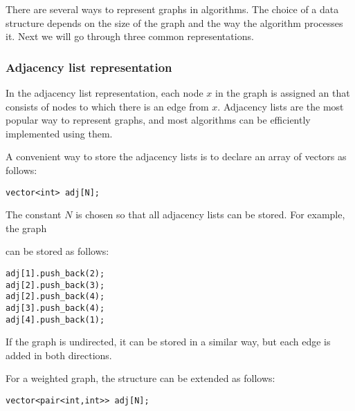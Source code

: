 There are several ways to represent graphs
in algorithms.
The choice of a data structure
depends on the size of the graph and
the way the algorithm processes it.
Next we will go through three common representations.

\subsubsection{Adjacency list representation}


In the adjacency list representation,
each node $x$ in the graph is assigned an 
that consists of nodes
to which there is an edge from $x$.
Adjacency lists are the most popular
way to represent graphs, and most algorithms can be
efficiently implemented using them.

A convenient way to store the adjacency lists is to declare
an array of vectors as follows:
\begin{lstlisting}
vector<int> adj[N];
\end{lstlisting}

The constant $N$ is chosen so that all
adjacency lists can be stored.
For example, the graph

\begin{center}
\end{center}
can be stored as follows:
\begin{lstlisting}
adj[1].push_back(2);
adj[2].push_back(3);
adj[2].push_back(4);
adj[3].push_back(4);
adj[4].push_back(1);
\end{lstlisting}

If the graph is undirected, it can be stored in a similar way,
but each edge is added in both directions.

For a weighted graph, the structure can be extended
as follows:

\begin{lstlisting}
vector<pair<int,int>> adj[N];
\end{lstlisting}

